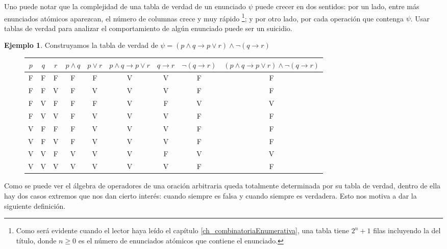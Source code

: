 \documentclass{book}
\theoremstyle{definition}
\newtheorem*{ejm}{Ejemplo}
\begin{document}
Uno puede notar que la complejidad de una tabla de verdad de un enunciado $\psi$ puede crecer en dos sentidos: por un lado, entre más enunciados atómicos aparezcan, el número de columnas crece y muy rápido
	\footnote{Como será evidente cuando el lector haya leído el capítulo \ref{ch_combinatoriaEnumerativa}, una tabla tiene $2^n+1$ filas incluyendo la del título, donde $n\geq 0$ es el número de enunciados atómicos que contiene el enunciado.};
y por otro lado, por cada operación que contenga $\psi$.
Usar tablas de verdad para analizar el comportamiento de algún enunciado puede ser un suicidio.
\begin{ejm}
	Construyamos la tabla de verdad de $\psi = \left(p \wedge q \rightarrow p \vee r \right)\wedge \neg \left(q \rightarrow r\right)$
	
	\begin{figure}[h]
	\begin{center}\begin{tabular}{|c|c|c||c|c|c|c|c|c|}
			\hline 
			$p$& $q$ & $r$ & $p \wedge q $ & $p \vee r$ & $p \wedge q  \rightarrow p \vee r $ & $q \rightarrow r$ & $\neg\left(q \rightarrow r\right)$ & $\left(p \wedge q \rightarrow p \vee r \right)\wedge \neg \left(q \rightarrow r\right)$ 
			\\
			\hline \hline
			F & F & F & F & F & V & V & F & F \\
			\hline
			F & F & V & F & V & V & V & F & F \\
			\hline
			F & V & F & F & F & V & F & V & V \\
			\hline
			F & V & V & F & V & V & V & F & F \\
			\hline
			V & F & F & F & V & V & V & F & F \\
			\hline
			V & F & V & F & V & V & V & F & F \\
			\hline
			V & V & F & V & V & V & F & V & V \\
			\hline
			V & V & V & V & V & V & V & F & F \\
			\hline
\end{tabular}\end{center}\end{figure}
\end{ejm}

Como se puede ver el álgebra de operadores de una oración arbitraria queda totalmente determinada por su tabla de verdad, dentro de ella hay dos casos extremos que nos dan cierto interés: cuando siempre es falsa y cuando siempre es verdadera. Esto nos motiva a dar la siguiente definición.
\end{document}
